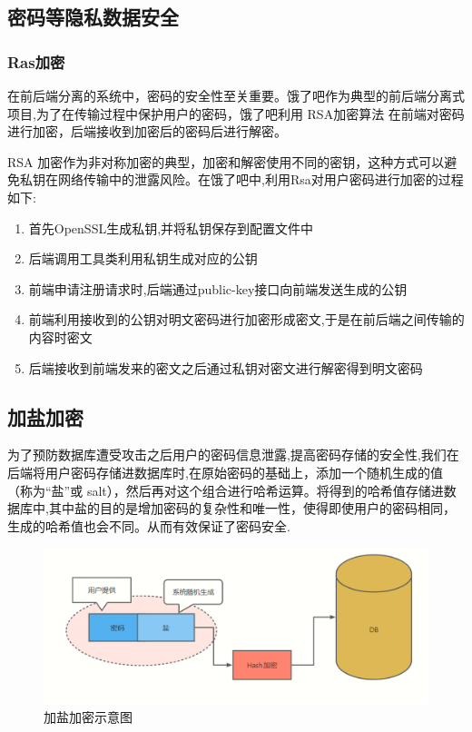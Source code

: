 \subsection{密码等隐私数据安全}
\subsubsection{Ras加密}
在前后端分离的系统中，密码的安全性至关重要。饿了吧作为典型的前后端分离式项目,为了在传输过程中保护用户的密码，饿了吧利用 RSA加密算法 在前端对密码进行加密，后端接收到加密后的密码后进行解密。
    
RSA 加密作为非对称加密的典型，加密和解密使用不同的密钥，这种方式可以避免私钥在网络传输中的泄露风险。在饿了吧中,利用Rsa对用户密码进行加密的过程如下:
\begin{enumerate}
    \item 首先OpenSSL生成私钥,并将私钥保存到配置文件中
    \item 后端调用工具类利用私钥生成对应的公钥
    \item 前端申请注册请求时,后端通过public-key接口向前端发送生成的公钥
    \item 前端利用接收到的公钥对明文密码进行加密形成密文,于是在前后端之间传输的内容时密文
    \item 后端接收到前端发来的密文之后通过私钥对密文进行解密得到明文密码
\end{enumerate}

\subsection{加盐加密}
为了预防数据库遭受攻击之后用户的密码信息泄露,提高密码存储的安全性,我们在后端将用户密码存储进数据库时,在原始密码的基础上，添加一个随机生成的值（称为“盐”或 salt），然后再对这个组合进行哈希运算。将得到的哈希值存储进数据库中,其中盐的目的是增加密码的复杂性和唯一性，使得即使用户的密码相同，生成的哈希值也会不同。从而有效保证了密码安全.

\begin{figure}[h]
    \centering
        \includegraphics[width=\linewidth]{pics/加盐加密.png}
    \caption{加盐加密示意图}
    \label{fig:jyjm}
\end{figure}

